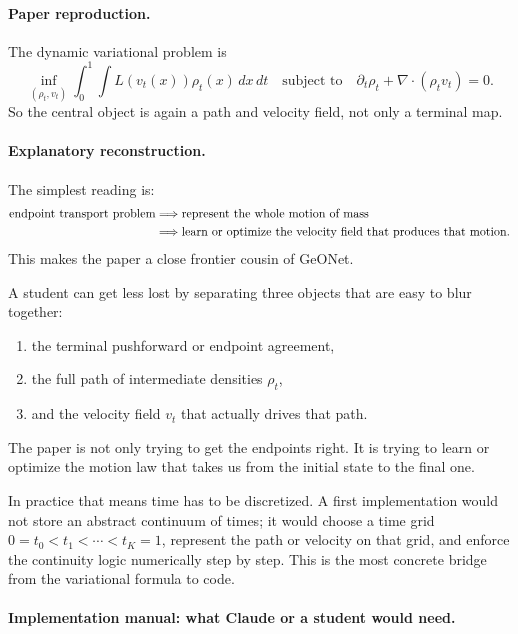 \documentclass[11pt]{report}
\begin{document}
\paragraph{Paper reproduction.}
The dynamic variational problem is
\begin{equation}
\inf_{(\rho_t,v_t)} \int_0^1 \int L(v_t(x))\rho_t(x)\,dx\,dt
\quad\text{subject to}\quad
\partial_t\rho_t + \nabla\cdot(\rho_t v_t)=0.
\label{eq:chenliu-dynamic}
\end{equation}
So the central object is again a path and velocity field, not only a terminal map.

\paragraph{Explanatory reconstruction.}
The simplest reading is:
\begin{align}
\text{endpoint transport problem}
&\Longrightarrow
\text{represent the whole motion of mass}
\notag\\
&\Longrightarrow
\text{learn or optimize the velocity field that produces that motion}.
\label{eq:chenliu-logic}
\end{align}
This makes the paper a close frontier cousin of GeONet.

A student can get less lost by separating three objects that are easy to blur
together:
\begin{enumerate}[label=(\roman*)]
  \item the terminal pushforward or endpoint agreement,
  \item the full path of intermediate densities $\rho_t$,
  \item and the velocity field $v_t$ that actually drives that path.
\end{enumerate}
The paper is not only trying to get the endpoints right.  It is trying to learn or
optimize the motion law that takes us from the initial state to the final one.

In practice that means time has to be discretized.  A first implementation would not
store an abstract continuum of times; it would choose a time grid
$0=t_0<t_1<\cdots<t_K=1$, represent the path or velocity on that grid, and enforce
the continuity logic numerically step by step.  This is the most concrete bridge from
the variational formula to code.

\paragraph{Implementation manual: what Claude or a student would need.}
\end{document}
